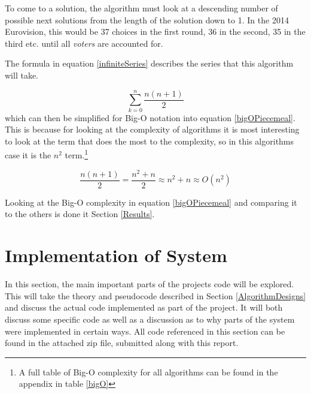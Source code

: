 \documentclass[12pt]{report}
\begin{document}
To come to a solution, the algorithm must look at a descending number of possible next solutions from the length of the solution down to 1. In the 2014 Eurovision, this would be 37 choices in the first round, 36 in the second, 35 in the third etc. until all \textit{voters} are accounted for.

The formula in equation \ref{infiniteSeries} describes the series that this algorithm will take.

\begin{equation}\label{infiniteSeries}
	\sum_{k=0}^{n} \frac{n(n+1)}{2}
\end{equation}
which can then be simplified for Big-O notation into equation \ref{bigOPiecemeal}. This is because for looking at the complexity of algorithms it is most interesting to look at the term that does the most to the complexity, so in this algorithms case it is the $n^2$ term.\footnote{A full table of Big-O complexity for all algorithms can be found in the appendix in table \ref{bigO}}

\begin{equation}\label{bigOPiecemeal}
	\frac{n(n+1)}{2} = \frac{n^2 + n}{2} \approx n^2 + n \approx O(n^2)
\end{equation}

Looking at the Big-O complexity in equation \ref{bigOPiecemeal} and comparing it to the others is done it Section \ref{Results}.

\clearpage
\section{Implementation of System}\label{Implementation}
In this section, the main important parts of the projects code will be explored. This will take the theory and pseudocode described in Section \ref{AlgorithmDesigns} and discuss the actual code implemented as part of the project. It will both discuss some specific code as well as a discussion as to why parts of the system were implemented in certain ways. All code referenced in this section can be found in the attached zip file, submitted along with this report.
\end{document}
